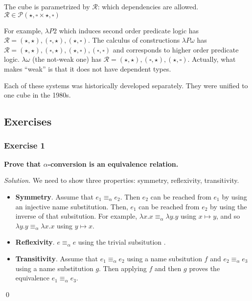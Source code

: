 The cube is parametrized by $\mathcal{R}$: which dependencies are allowed. 
$\mathcal{R} \in \mathcal{P}({\star, \square}\times{\star, \square})$

For example, $\lambda P2$ which induces second order predicate logic has $\mathcal{R} = {(\star, \star), (\square, \star), (\star, \square)}$.
The calculus of constructions $\lambda P \omega$ has $\mathcal{R} = {(\star, \star), (\square, \star), (\star, \square), (\square, \square)}$
and corresponds to higher order predicate logic.
$\lambda \omega$ (the not-weak one) has $\mathcal{R} = {(\star, \star), (\square, \star), (\star, \square)}$. 
Actually, what makes \wlo ``weak'' is that it does not have dependent types.

Each of these systems was historically developed separately. They were unified to one cube in the 1980s.

\subsection{Exercises}

\subsubsection{Exercise 1}

\textbf{Prove that $\alpha$-conversion is an equivalence relation.}

\emph{Solution.} We need to show three properties: symmetry, reflexivity, transitivity.
\begin{itemize}
\item \textbf{Symmetry}. Assume that $e_1 \equiv_\alpha e_2$. Then $e_2$ can be reached from $e_1$ by using 
an injective name substitution. Then, $e_1$ can be reached from $e_2$ by using the inverse of that subsitution.
For example, $\lambda x. x \equiv_\alpha \lambda y. y$ using ${x \mapsto y}$, and so $\lambda y. y \equiv_\alpha \lambda x. x$
using ${y \mapsto x}$.
\item \textbf{Reflexivity}. $e \equiv_\alpha e$ using the trivial subsitution ${}$.
\item \textbf{Transitivity}. Assume that $e_1 \equiv_\alpha e_2$ using a name subsitution $f$ and $e_2 \equiv_\alpha e_3$
using a name substitution $g$. Then applying $f$ and then $g$ proves the equivalence $e_1 \equiv_\alpha e_3$.
\end{itemize}
\qed

